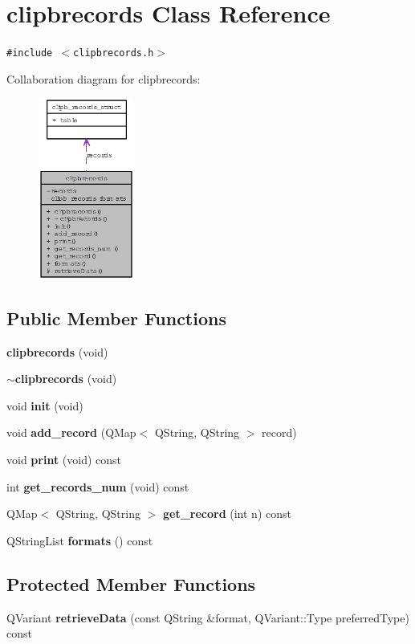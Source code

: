 \section{clipbrecords Class Reference}
\label{classclipbrecords}
{\tt \#include $<$clipbrecords.h$>$}

Collaboration diagram for clipbrecords:\begin{figure}[H]
\begin{center}
\leavevmode
\includegraphics[width=89pt]{classclipbrecords__coll__graph}
\end{center}
\end{figure}
\subsection*{Public Member Functions}
\begin{CompactItemize}
\item 
{\bf clipbrecords} (void)
\item 
{\bf $\sim$clipbrecords} (void)
\item 
void {\bf init} (void)
\item 
void {\bf add\_\-record} (QMap$<$ QString, QString $>$ record)
\item 
void {\bf print} (void) const
\item 
int {\bf get\_\-records\_\-num} (void) const
\item 
QMap$<$ QString, QString $>$ {\bf get\_\-record} (int n) const
\item 
QString\-List {\bf formats} () const
\end{CompactItemize}
\subsection*{Protected Member Functions}
\begin{CompactItemize}
\item 
QVariant {\bf retrieve\-Data} (const QString \&format, QVariant::Type preferred\-Type) const
\end{CompactItemize}

